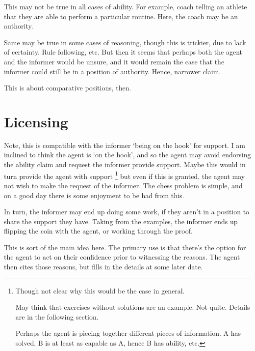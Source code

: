 \documentclass[10pt]{article}
\begin{document}
\begin{note}
  This may not be true in all cases of ability.
  For example, coach telling an athlete that they are able to perform a particular routine.
  Here, the coach may be an authority.

  Same may be true in some cases of reasoning, though this is trickier, due to lack of certainty.
  Rule following, etc.
  But then it seems that perhaps both the agent and the informer would be unsure, and it would remain the case that the informer could still be in a position of authority.
  Hence, narrower claim.

  This is about comparative positions, then.
\end{note}

\newpage



\section{Licensing}
\label{sec:licensing}

\begin{note}[Guarantee]
  Note, this is compatible with the informer `being on the hook' for support.
I am inclined to think the agent is `on the hook', and so the agent may avoid endorsing the ability claim and request the informer provide support.
Maybe this would in turn provide the agent with support\nolinebreak
\footnote{
  Though not clear why this would be the case in general.

  May think that exercises without solutions are an example.
  Not quite.
  Details are in the following section.

  Perhaps the agent is piecing together different pieces of information.
  A has solved, B is at least as capable as A, hence B has ability, etc.
}
but even if this is granted, the agent may not wish to make the request of the informer.
The chess problem is simple, and on a good day there is some enjoyment to be had from this.

In turn, the informer may end up doing some work, if they aren't in a position to share the support they have.
Taking from the examples, the informer ends up flipping the coin with the agent, or working through the proof.
\end{note}

\begin{note}[Async]
  This is sort of the main idea here.
  The primary use is that there's the option for the agent to act on their confidence prior to witnessing the reasons.
  The agent then cites those reasons, but fills in the details at some later date.
\end{note}
\end{document}
